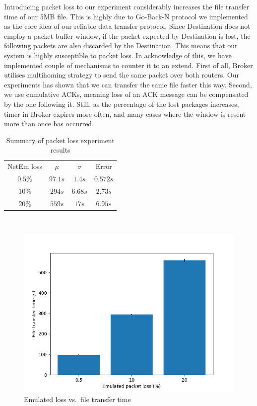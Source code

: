 \documentclass[conference]{IEEEtran}
\begin{document}
Introducing packet loss to our experiment considerably increases the file transfer time of our 5MB file. This is highly due to Go-Back-N protocol we implemented as the core idea of our reliable data transfer protocol. Since Destination does not employ a packet buffer window, if the packet expected by Destination is lost, the following packets are also discarded by the Destination. This means that our system is highly susceptible to packet loss. In acknowledge of this, we have implemented couple of mechanisms to counter it to an extend. First of all, Broker utilises multihoming strategy to send the same packet over both routers. Our experiments has shown that we can transfer the same file faster this way. Second, we use cumulative ACKs, meaning loss of an ACK message can be compensated by the one following it. Still, as the percentage of the lost packages increases, timer in Broker expires more often, and many cases where the window is resent more than once has occurred.

\begin{table}
    \centering
    \begin{tabular}{c c c c}
        \toprule
        NetEm loss & $\mu$ & $\sigma$ & Error \\
        $0.5\%$   &   $97.1s$   &   $1.4s$    &   $0.572s$ \\
        $10\%$   &    $294s$   &   $6.68s$    &   $2.73s$ \\
        $20\%$   &    $559s$   &   $17s$    &   $6.95s$ \\
        \bottomrule
    \end{tabular}\label{table:loss} \\
    \caption{Summary of packet loss experiment results}\label{table:loss}
\end{table}

\begin{figure}
    \centering
    \includegraphics[scale=0.6]{graphics/plot-loss}
    \caption{Emulated loss vs.\ file transfer time}\label{fig:loss}
\end{figure}
\end{document}
